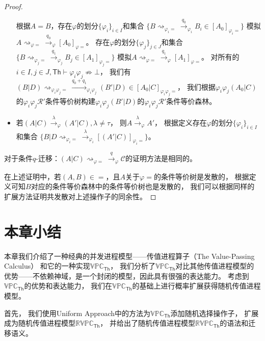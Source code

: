 \begin{proof}
\begin{itemize}
{         根据$A=B$，存在$\varphi$的划分$\{\varphi_i\}_{i\in I}$和集合
         $\{B\rightsquigarrow_{\varphi_i=}\stackrel{q_0}{\rightarrow}_{\varphi_i}B_i\in [A_0]_{\varphi_i =}\}$
         模拟$A\rightsquigarrow_{\varphi = }\stackrel{q_0}{\rightarrow}_{\varphi}[A_0]_{\varphi=}$。
         存在$\varphi$的划分$\{\varphi_j\}_{j\in J}$和集合
         $\{B\rightsquigarrow_{\varphi_j=}\stackrel{q_1}{\rightarrow}_{\varphi_j}B_j\in [A_1]_{\varphi_j =}\}$
         模拟$A\rightsquigarrow_{\varphi = }\stackrel{q_1}{\rightarrow}_{\varphi}[A_1]_{\varphi=}$。
         对所有的$i\in I, j\in J, \mathsf{Th}\vdash \varphi_i\varphi_j\not\Rightarrow \bot$，
         我们有$(B|D)\rightsquigarrow_{\varphi_i\varphi_j=}\stackrel{q_0+q_1}{\longrightarrow}_{\varphi_i\varphi_j}(B'|D)\in[A_0|C]_{\varphi_i\varphi_j=}$，
         我们根据$\varphi_i\varphi_j (A_0|C)$的$\varphi_i\varphi_j \mathcal{R}' $条件等价树构建$\varphi_i\varphi_j(B'|D)$的$\varphi_i\varphi_j \mathcal{R}' $条件等价森林。
      }
      \item {
         若$(A|C)\stackrel{\lambda}{\rightarrow}_{\varphi} (A'|C), \lambda\neq \tau$，
         则$A\stackrel{\lambda}{\rightarrow}_{\varphi} A'$，
         根据定义存在$\varphi$的划分$\{\varphi_i\}_{i\in I}$和集合
         $\{B|D\rightsquigarrow_{\varphi_i=}\stackrel{\lambda}{\rightarrow}_{\varphi_i} [(A'|C)]_{\varphi_i=}\}$。
      }
   \end{itemize}
   对于条件$q$-迁移：$(A|C)\rightsquigarrow_{\varphi=}\stackrel{q}{\rightarrow}_{\varphi}\mathcal{C}$的证明方法是相同的。

   在上述证明中，若$(A,B)\in =$，且$A$关于$\varphi =$的条件等价树是发散的，
   根据定义可知$B$对应的条件等价森林中的条件等价树也是发散的，
   我们可以根据同样的扩展方法证明共发散对上述操作子的同余性。
\end{proof}

\section{本章小结}
本章我们介绍了一种经典的并发进程模型——传值进程算子（The Value-Passing Calculus）
和它的一种实现$\mathbb{VPC}_{\mathsf{Th}}$，
我们分析了$\mathbb{VPC}_{\mathsf{Th}}$对比其他传值进程模型的优势——不依赖神域，是一个封闭的模型，因此具有很强的表达能力。
考虑到$\mathbb{VPC}_{\mathsf{Th}}$的优势和表达能力，
我们在$\mathbb{VPC}_{\mathsf{Th}}$的基础上进行概率扩展获得随机传值进程模型。

首先，
我们使用Uniform Approach中的方法为$\mathbb{VPC}_{\mathsf{Th}}$添加随机选择操作子，
扩展成为随机传值进程模型$\mathbb{RVPC}_{\mathsf{Th}}$，
并给出了随机传值进程模型$\mathbb{RVPC}_{\mathsf{Th}}$的语法和迁移语义。

